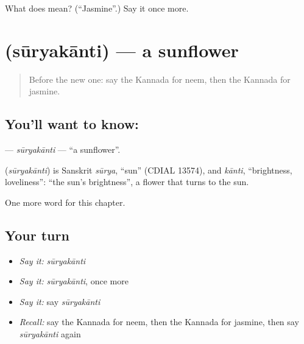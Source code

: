 \begin{tcolorbox}[breakable,colback=teal!4,colframe=teal!35!black,title={Before you move on}]
What does  mean? (\textquotedblleft{}Jasmine\textquotedblright{}.) Say it once more.
\end{tcolorbox}
\section[\texorpdfstring{\kn{ಸೂರ್ಯಕಾಂತಿ} (sūryakānti)}{ಸೂರ್ಯಕಾಂತಿ (sūryakānti)}]{ (sūryakānti) — a sunflower}

\label{lesson:KA-C225-suryakanti}



\begin{quote}
Before the new one: say the Kannada for neem, then the Kannada for jasmine.
\end{quote}

\subsection*{You'll want to know: }
\textbf{} — \emph{sūryakānti} — \textquotedblleft{}a sunflower\textquotedblright{}.

\begin{cousinweb}
\textbf{} (\emph{sūryakānti}) is Sanskrit \emph{sūrya}, \textquotedblleft{}sun\textquotedblright{} (CDIAL 13574), and \emph{kānti}, \textquotedblleft{}brightness, loveliness\textquotedblright{}: \textquotedblleft{}the sun's brightness\textquotedblright{}, a flower that turns to the sun.
\end{cousinweb}

\begin{grammarlens}[title={What you've built}]
One more word for this chapter.
\end{grammarlens}

\subsection*{Your turn}
\begin{itemize}
\raggedright
  \item \emph{Say it:} \emph{sūryakānti}
  \item \emph{Say it:} \emph{sūryakānti}, once more
  \item \emph{Say it:} say \emph{sūryakānti}
  \item \emph{Recall:} say the Kannada for neem, then the Kannada for jasmine, then say \emph{sūryakānti} again
\end{itemize}

